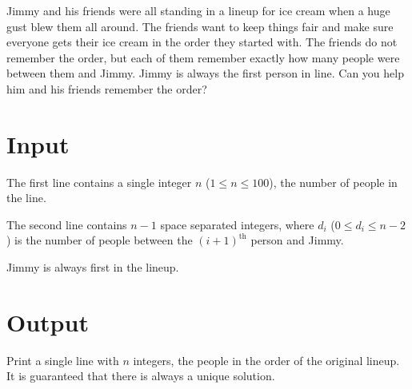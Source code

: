 
Jimmy and his friends were all standing in a lineup for ice cream
when a huge gust blew them all around. The friends want to
keep things fair and make sure everyone gets their ice cream in the
order they started with. The friends do not remember the order,
but each of them remember exactly how many people were between
them and Jimmy. Jimmy is always the first person in
line. Can you help him and his friends remember the order?

\section*{Input}

The first line contains a single integer $n$ ($1 \leq n \leq 100$),
the number of people in the line.

The second line contains $n-1$ space separated integers, where $d_i$ ($0 
\leq d_i \leq n-2$) is the number of people between the $(i+1)^\textrm{th}$ person 
and Jimmy.

Jimmy is always first in the lineup.

\section*{Output}

Print a single line with $n$ integers, the people in the order of the original
lineup. It is guaranteed that there is always a unique solution.

